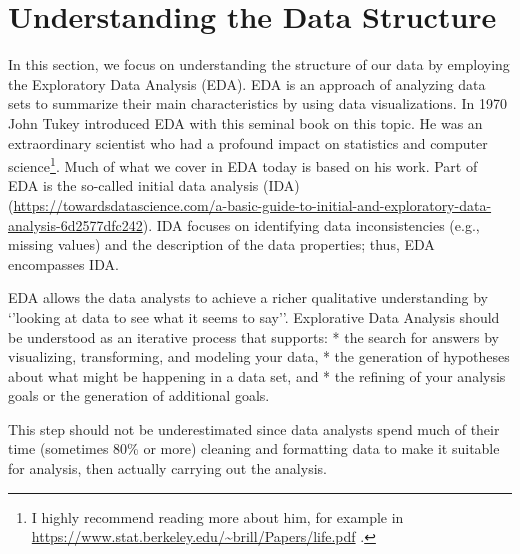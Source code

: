 \documentclass[
]{book}
\begin{document}
\hypertarget{understanding-the-data-structure}{%
\section{Understanding the Data Structure}\label{understanding-the-data-structure}}

In this section, we focus on understanding the structure of our data by employing the Exploratory Data Analysis (EDA). EDA is an approach of analyzing data sets to summarize their main characteristics by using data visualizations. In 1970 John Tukey \citep{Tukey1977eda} introduced EDA with this seminal book on this topic. He was an extraordinary scientist who had a profound impact on statistics and computer science\footnote{I highly recommend reading more about him, for example in \url{https://www.stat.berkeley.edu/~brill/Papers/life.pdf} .}. Much of what we cover in EDA today is based on his work. Part of EDA is the so-called initial data analysis (IDA) (\url{https://towardsdatascience.com/a-basic-guide-to-initial-and-exploratory-data-analysis-6d2577dfc242}). IDA focuses on identifying data inconsistencies (e.g., missing values) and the description of the data properties; thus, EDA encompasses IDA.

EDA allows the data analysts to achieve a richer qualitative understanding by `'looking at data to see what it seems to say''. Explorative Data Analysis should be understood as an iterative process that supports:
* the search for answers by visualizing, transforming, and modeling your data,
* the generation of hypotheses about what might be happening in a data set, and
* the refining of your analysis goals or the generation of additional goals.

This step should not be underestimated since data analysts spend much of their time (sometimes 80\% or more) cleaning and formatting data to make it suitable for analysis, then actually carrying out the analysis.
\end{document}
